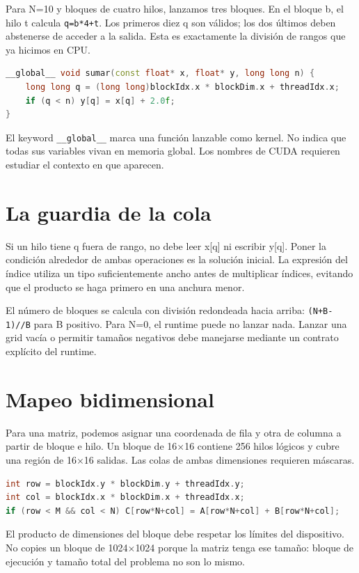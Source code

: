 \documentclass[12pt,a4paper,oneside]{report}
\begin{document}
Para N=10 y bloques de cuatro hilos, lanzamos tres bloques. En el bloque b, el hilo t calcula \texttt{q=b*4+t}. Los primeros diez q son válidos; los dos últimos deben abstenerse de acceder a la salida. Esta es exactamente la división de rangos que ya hicimos en CPU.

\begin{lstlisting}[language=C++]
__global__ void sumar(const float* x, float* y, long long n) {
    long long q = (long long)blockIdx.x * blockDim.x + threadIdx.x;
    if (q < n) y[q] = x[q] + 2.0f;
}
\end{lstlisting}
El keyword \texttt{\_\_global\_\_} marca una función lanzable como kernel. No indica que todas sus variables vivan en memoria global. Los nombres de CUDA requieren estudiar el contexto en que aparecen.

\section{La guardia de la cola}
Si un hilo tiene q fuera de rango, no debe leer x[q] ni escribir y[q]. Poner la condición alrededor de ambas operaciones es la solución inicial. La expresión del índice utiliza un tipo suficientemente ancho antes de multiplicar índices, evitando que el producto se haga primero en una anchura menor.

El número de bloques se calcula con división redondeada hacia arriba: \texttt{(N+B-1)//B} para B positivo. Para N=0, el runtime puede no lanzar nada. Lanzar una grid vacía o permitir tamaños negativos debe manejarse mediante un contrato explícito del runtime.

\section{Mapeo bidimensional}
Para una matriz, podemos asignar una coordenada de fila y otra de columna a partir de bloque e hilo. Un bloque de 16\ensuremath{\times}16 contiene 256 hilos lógicos y cubre una región de 16\ensuremath{\times}16 salidas. Las colas de ambas dimensiones requieren máscaras.

\begin{lstlisting}[language=C++]
int row = blockIdx.y * blockDim.y + threadIdx.y;
int col = blockIdx.x * blockDim.x + threadIdx.x;
if (row < M && col < N) C[row*N+col] = A[row*N+col] + B[row*N+col];
\end{lstlisting}
El producto de dimensiones del bloque debe respetar los límites del dispositivo. No copies un bloque de 1024\ensuremath{\times}1024 porque la matriz tenga ese tamaño: bloque de ejecución y tamaño total del problema no son lo mismo.
\end{document}
